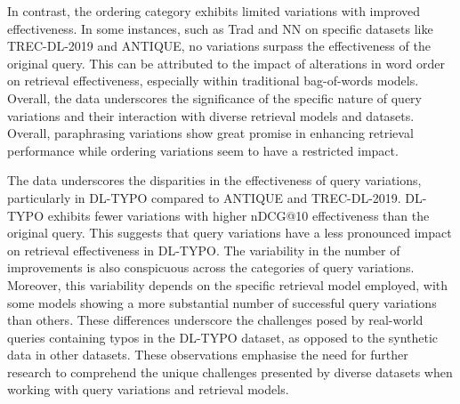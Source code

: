 In contrast, the ordering category exhibits limited variations with improved effectiveness. In some instances, such as Trad and NN on specific datasets like TREC-DL-2019 and ANTIQUE, no variations surpass the effectiveness of the original query. This can be attributed to the impact of alterations in word order on retrieval effectiveness, especially within traditional bag-of-words models. Overall, the data underscores the significance of the specific nature of query variations and their interaction with diverse retrieval models and datasets. Overall, paraphrasing variations show great promise in enhancing retrieval performance while ordering variations seem to have a restricted impact.

The data underscores the disparities in the effectiveness of query variations, particularly in DL-TYPO compared to ANTIQUE and TREC-DL-2019. DL-TYPO exhibits fewer variations with higher nDCG@10 effectiveness than the original query. This suggests that query variations have a less pronounced impact on retrieval effectiveness in DL-TYPO. The variability in the number of improvements is also conspicuous across the categories of query variations. Moreover, this variability depends on the specific retrieval model employed, with some models showing a more substantial number of successful query variations than others. These differences underscore the challenges posed by real-world queries containing typos in the DL-TYPO dataset, as opposed to the synthetic data in other datasets. These observations emphasise the need for further research to comprehend the unique challenges presented by diverse datasets when working with query variations and retrieval models.
